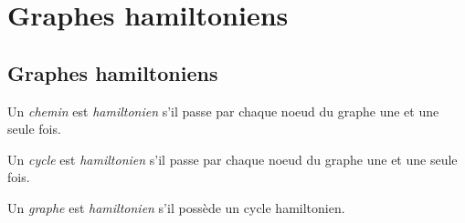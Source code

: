 \section{Graphes hamiltoniens}
\subsection{Graphes hamiltoniens}
\begin{mydef}
  Un \emph{chemin} est \emph{hamiltonien} s’il passe par chaque noeud du graphe une et une seule fois.
\end{mydef}

\begin{mydef}
  Un \emph{cycle} est \emph{hamiltonien} s’il passe par chaque noeud du graphe une et une seule fois.
\end{mydef}

\begin{mydef}
  Un \emph{graphe} est \emph{hamiltonien} s’il possède un cycle hamiltonien.
\end{mydef}

